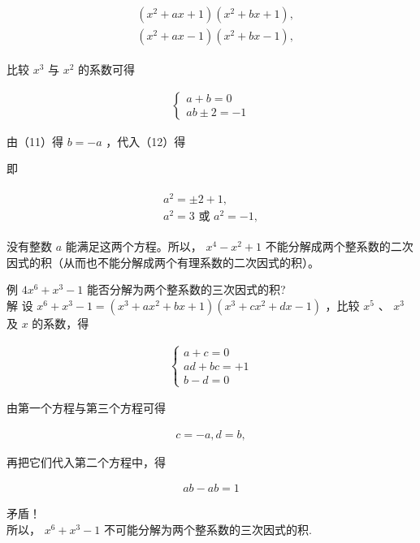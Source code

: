 \documentclass[10pt]{article}
\begin{document}
\begin{align*}
\begin{aligned}
& \left(x^{2}+a x+1\right)\left(x^{2}+b x+1\right), \\
& \left(x^{2}+a x-1\right)\left(x^{2}+b x-1\right),
\end{aligned}
\end{align*}

比较 $x^{3}$ 与 $x^{2}$ 的系数可得

\begin{align*}
\left\{\begin{array}{l}
a+b=0  \tag{11}\\
a b \pm 2=-1
\end{array}\right.
\end{align*}

由（11）得 $b=-a$ ，代入（12）得

即

\begin{align*}
\begin{gathered}
a^{2}= \pm 2+1, \\
a^{2}=3 \text { 或 } a^{2}=-1,
\end{gathered}
\end{align*}

没有整数 $a$ 能满足这两个方程。所以， $x^{4}-x^{2}+1$ 不能分解成两个整系数的二次因式的积（从而也不能分解成两个有理系数的二次因式的积）。

例 $4 x^{6}+x^{3}-1$ 能否分解为两个整系数的三次因式的积?\\
解 设 $x^{6}+x^{3}-1=\left(x^{3}+a x^{2}+b x+1\right)\left(x^{3}+c x^{2}+d x-1\right)$ ，比较 $x^{5}$ 、 $x^{3}$ 及 $x$ 的系数，得

\begin{align*}
\left\{\begin{array}{l}
a+c=0 \\
a d+b c=+1 \\
b-d=0
\end{array}\right.
\end{align*}

由第一个方程与第三个方程可得

\begin{align*}
c=-a, d=b,
\end{align*}

再把它们代入第二个方程中，得

\begin{align*}
a b-a b=1
\end{align*}

矛盾！\\
所以， $x^{6}+x^{3}-1$ 不可能分解为两个整系数的三次因式的积.
\end{document}
